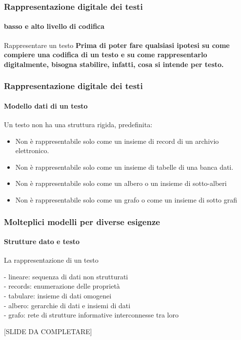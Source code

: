 \begin{frame}
	\frametitle{Rappresentazione digitale dei testi}
	\framesubtitle{basso e alto livello di codifica}
	\addtocounter{nframe}{1}

	\begin{block}{Rappresentare un testo}
		\textbf{
			Prima di poter fare qualsiasi ipotesi su come compiere una codifica di un testo e su come rappresentarlo digitalmente, bisogna stabilire, infatti, cosa si intende per testo.
		}
	\end{block}

\end{frame}


\begin{frame}
	\frametitle{Rappresentazione digitale dei testi}
	\framesubtitle{Modello dati di un testo}
	\addtocounter{nframe}{1}

	\begin{block}{Un testo non ha una struttura rigida, predefinita: }
		\begin{itemize}

			\item Non è rappresentabile solo come un insieme di record di un archivio elettronico.
			\item Non è rappresentabile solo come un insieme di tabelle di una banca dati.
			\item Non è rappresentabile solo come un albero o un insieme di sotto-alberi
			\item Non è rappresentabile solo come un grafo o come un insieme di sotto grafi

		\end{itemize}

	\end{block}

\end{frame}

\begin{frame}
	\frametitle{Molteplici modelli per diverse esigenze}
	\framesubtitle{Strutture dato e testo}
	\addtocounter{nframe}{1}

	\begin{block}{La rappresentazione di un testo}
		\begin{center}
			- lineare: sequenza di dati non strutturati
			\\- records: enumerazione delle proprietà
			\\- tabulare: insieme di dati omogenei
			\\- albero: gerarchie di dati e insiemi di dati
			\\- grafo: rete di strutture informative interconnesse tra loro
        \end{center}
        
	\end{block}
    [SLIDE DA COMPLETARE]
\end{frame}



